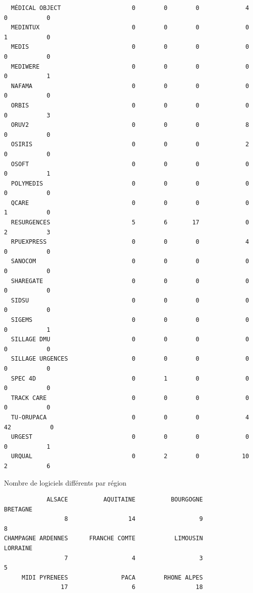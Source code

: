\documentclass[]{article}
\begin{document}
\begin{verbatim}
  MÉDICAL OBJECT                    0        0        0             4    0           0
  MEDINTUX                          0        0        0             0    1           0
  MEDIS                             0        0        0             0    0           0
  MEDIWERE                          0        0        0             0    0           1
  NAFAMA                            0        0        0             0    0           0
  ORBIS                             0        0        0             0    0           3
  ORUV2                             0        0        0             8    0           0
  OSIRIS                            0        0        0             2    0           0
  OSOFT                             0        0        0             0    0           1
  POLYMEDIS                         0        0        0             0    0           0
  QCARE                             0        0        0             0    1           0
  RESURGENCES                       5        6       17             0    2           3
  RPUEXPRESS                        0        0        0             4    0           0
  SANOCOM                           0        0        0             0    0           0
  SHAREGATE                         0        0        0             0    0           0
  SIDSU                             0        0        0             0    0           0
  SIGEMS                            0        0        0             0    0           1
  SILLAGE DMU                       0        0        0             0    0           0
  SILLAGE URGENCES                  0        0        0             0    0           0
  SPEC 4D                           0        1        0             0    0           0
  TRACK CARE                        0        0        0             0    0           0
  TU-ORUPACA                        0        0        0             4   42           0
  URGEST                            0        0        0             0    0           1
  URQUAL                            0        2        0            10    2           6
\end{verbatim}

Nombre de logiciels différents par région

\begin{verbatim}
            ALSACE          AQUITAINE          BOURGOGNE           BRETAGNE 
                 8                 14                  9                  8 
CHAMPAGNE ARDENNES      FRANCHE COMTE           LIMOUSIN           LORRAINE 
                 7                  4                  3                  5 
     MIDI PYRENEES               PACA        RHONE ALPES 
                17                  6                 18 
\end{verbatim}
\end{document}
